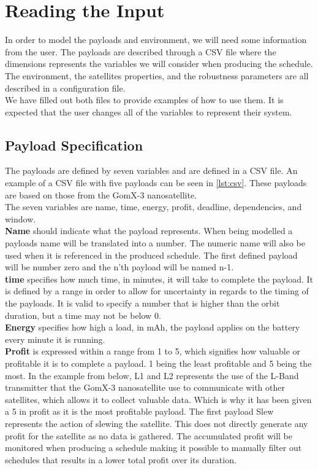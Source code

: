 \section{Reading the Input} \label{sec:read_input}
In order to model the payloads and environment, we will need some information from the user. The payloads are described through a CSV file where the dimensions represents the variables we will consider when producing the schedule. The environment, the satellites properties, and the robustness parameters are all described in a configuration file.\\
We have filled out both files to provide examples of how to use them. It is expected that the user changes all of the variables to represent their system.

\subsection{Payload Specification} \label{subsec:csv}
The payloads are defined by seven variables and are defined in a CSV file. An example of a CSV file with five payloads can be seen in \cref{lst:csv}. These payloads are based on those from the GomX-3 nanosatellite\cite{gomx3}.\\
The seven variables are name, time, energy, profit, deadline, dependencies, and window.\\
\textbf{Name} should indicate what the payload represents. When being modelled a payloads name will be translated into a number. The numeric name will also be used when it is referenced in the produced schedule. The first defined payload will be number zero and the n'th payload will be named n-1.\\
\textbf{time} specifies how much time, in minutes, it will take to complete the payload. It is defined by a range in order to allow for uncertainty in regards to the timing of the payloads. It is valid to specify a number that is higher than the orbit duration, but a time may not be below 0.\\
\textbf{Energy} specifies how high a load, in mAh, the payload applies on the battery every minute it is running.\\
\textbf{Profit} is expressed within a range from 1 to 5, which signifies how valuable or profitable it is to complete a payload.
1 being the least profitable and 5 being the most.
In the example from below, L1 and L2 represents the use of the L-Band transmitter that the GomX-3 nanosatellite use to communicate with other satellites, which allows it to collect valuable data. Which is why it has been given a 5 in profit as it is the most profitable payload. The first payload Slew represents the action of slewing the satellite. This does not directly generate any profit for the satellite as no data is gathered. The accumulated profit will be monitored when producing a schedule making it possible to manually filter out schedules that results in a lower total profit over its duration.\\
